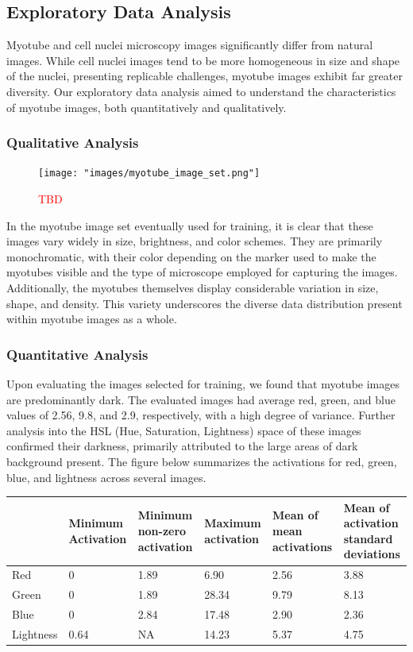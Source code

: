 \subsection{Exploratory Data Analysis}\label{secexploratory}
Myotube and cell nuclei microscopy images significantly differ from natural images. While cell nuclei images tend to be more homogeneous in size and shape of the nuclei, presenting replicable challenges, myotube images exhibit far greater diversity. Our exploratory data analysis aimed to understand the characteristics of myotube images, both quantitatively and qualitatively.

\subsubsection{Qualitative Analysis}
\begin{figure}
	\centering
	\texttt{[image: "images/myotube\_image\_set.png"]}
	\caption[TBD]{\textcolor{red}{TBD}}
	\label{fig1}
\end{figure}
In the myotube image set eventually used for training, it is clear that these images vary widely in size, brightness, and color schemes. They are primarily monochromatic, with their color depending on the marker used to make the myotubes visible and the type of microscope employed for capturing the images. Additionally, the myotubes themselves display considerable variation in size, shape, and density. This variety underscores the diverse data distribution present within myotube images as a whole.

\subsubsection{Quantitative Analysis}
Upon evaluating the images selected for training, we found that myotube images are predominantly dark. The evaluated images had average red, green, and blue values of 2.56, 9.8, and 2.9, respectively, with a high degree of variance. Further analysis into the HSL (Hue, Saturation, Lightness) space of these images confirmed their darkness, primarily attributed to the large areas of dark background present. The figure below summarizes the activations for red, green, blue, and lightness across several images.

\begin{tabular}{|p{2cm}|p{2cm}|p{2cm}|p{2cm}|p{2cm}|p{2cm}|}
	\hline
	& Minimum Activation & Minimum non-zero  activation & Maximum activation & Mean of mean activations & Mean of activation standard deviations \\
	\hline
	Red & 0 & 1.89 & 6.90 & 2.56 & 3.88 \\
	\hline
	Green & 0 & 1.89 & 28.34 & 9.79 & 8.13 \\
	\hline
	Blue & 0 & 2.84 & 17.48 & 2.90 & 2.36 \\
	\hline
	Lightness & 0.64 & NA & 14.23 & 5.37 & 4.75 \\
	\hline
\end{tabular}

